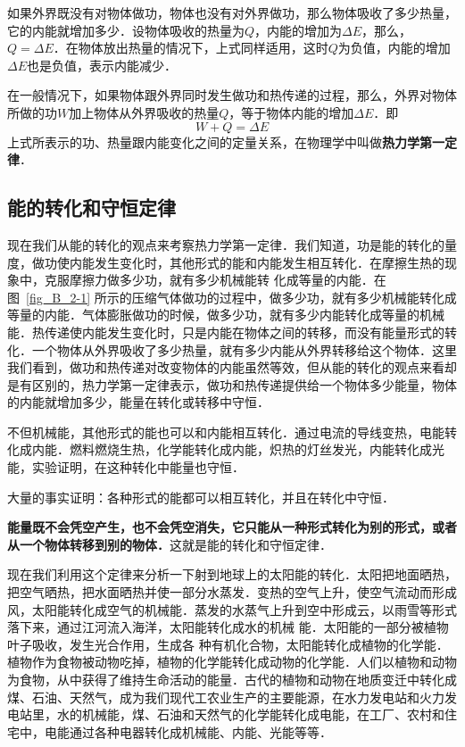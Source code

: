如果外界既没有对物体做功，物体也没有对外界做功，那么物体吸收了多少热量，它的内能就增加多少．设物体吸收的热量为$Q$，内能的增加为$\Delta E$，那么，$Q=\Delta E$．在物体放出热量的情况下，上式同样适用，这时$Q$为负值，内能的增加$\Delta E$也是负值，表示内能减少．

在一般情况下，如果物体跟外界同时发生做功和热传递的过程，那么，外界对物体所做的功$W$加上物体从外界吸收的热量$Q$，等于物体内能的增加$\Delta E$．即
\[W+Q=\Delta E\]
上式所表示的功、热量跟内能变化之间的定量关系，在物理学中叫做\textbf{热力学第一定律}．

\subsection{能的转化和守恒定律} 
现在我们从能的转化的观点来考察热力学第一定律．我们知道，功是能的转化的量度，做功使内能发生变化时，其他形式的能和内能发生相互转化．在摩擦生热的现象中，克服摩擦力做多少功，就有多少机械能转
化成等量的内能．在图~\ref{fig_B_2-1} 所示的压缩气体做功的过程中，做多少功，就有多少机械能转化成等量的内能．气体膨胀做功的时候，做多少功，就有多少内能转化成等量的机械能．热传递使内能发生变化时，只是内能在物体之间的转移，而没有能量形式的转化．一个物体从外界吸收了多少热量，就有多少内能从外界转移给这个物体．这里我们看到，做功和热传递对改变物体的内能虽然等效，但从能的转化的观点来看却是有区别的，热力学第一定律表示，做功和热传递提供给一个物体多少能量，物体的内能就增加多少，能量在转化或转移中守恒．

不但机械能，其他形式的能也可以和内能相互转化．通过电流的导线变热，电能转化成内能．燃料燃烧生热，化学能转化成内能，炽热的灯丝发光，内能转化成光能，实验证明，在这种转化中能量也守恒．

大量的事实证明：各种形式的能都可以相互转化，并且在转化中守恒．


\textbf{能量既不会凭空产生，也不会凭空消失，它只能从一种形式转化为别的形式，或者从一个物体转移到别的物体．}这就是能的转化和守恒定律．

现在我们利用这个定律来分析一下射到地球上的太阳能的转化．太阳把地面晒热，把空气晒热，把水面晒热并使一部分水蒸发．变热的空气上升，使空气流动而形成风，太阳能转化成空气的机械能．蒸发的水蒸气上升到空中形成云，以雨雪等形式落下来，通过江河流入海洋，太阳能转化成水的机械
能．太阳能的一部分被植物叶子吸收，发生光合作用，生成各
种有机化合物，太阳能转化成植物的化学能．植物作为食物被动物吃掉，植物的化学能转化成动物的化学能．人们以植物和动物为食物，从中获得了维持生命活动的能量．古代的植物和动物在地质变迁中转化成煤、石油、天然气，成为我们现代工农业生产的主要能源，在水力发电站和火力发电站里，水的机械能，煤、石油和天然气的化学能转化成电能，在工厂、农村和住宅中，电能通过各种电器转化成机械能、内能、光能等等．

